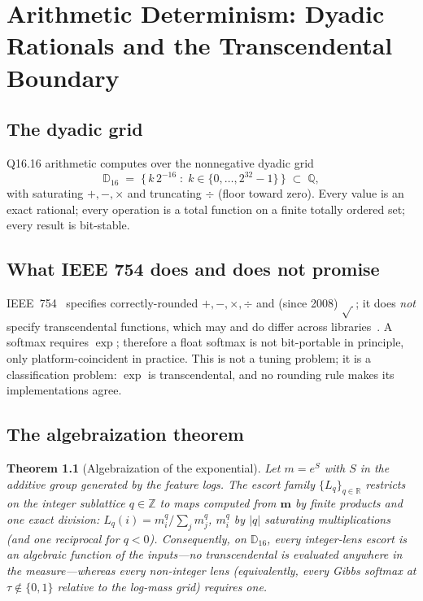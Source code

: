\documentclass[12pt,oneside]{report}
\theoremstyle{plain}
\newtheorem{theorem}{Theorem}[chapter]
\theoremstyle{definition}
\theoremstyle{remark}
\newcommand{\R}{\mathbb{R}}
\newcommand{\Z}{\mathbb{Z}}
\newcommand{\Q}{\mathbb{Q}}
\newcommand{\dyad}{\mathbb{D}}
\newcommand{\escort}[1]{L_{#1}}
\newcommand{\mass}{\mathbf{m}}
\begin{document}
\chapter{Arithmetic Determinism: Dyadic Rationals and the Transcendental Boundary}
\label{ch:arithmetic}

\section{The dyadic grid}

Q16.16 arithmetic computes over the nonnegative dyadic grid
\begin{equation}
\dyad_{16} \;=\; \bigl\{\, k\,2^{-16} \;:\; k\in\{0,\dots,2^{32}-1\}
\,\bigr\} \;\subset\; \Q,
\end{equation}
with saturating $+,-,\times$ and truncating $\div$ (floor toward zero).
Every value is an exact rational; every operation is a total function
on a finite totally ordered set; every result is bit-stable.

\section{What IEEE 754 does and does not promise}

IEEE~754~\cite{ieee754} specifies correctly-rounded $+,-,\times,\div$
and (since 2008) $\sqrt{\,}$; it does \emph{not} specify
transcendental functions, which may and do differ across
libraries~\cite{goldberg1991}. A softmax requires $\exp$; therefore a
float softmax is not bit-portable in principle, only
platform-coincident in practice. This is not a tuning problem; it is a
classification problem: $\exp$ is transcendental, and no rounding rule
makes its implementations agree.

\section{The algebraization theorem}

\begin{theorem}[Algebraization of the exponential]
\label{thm:algebraization}
Let $m=e^{S}$ with $S$ in the additive group generated by the feature
logs. The escort family $\{\escort{q}\}_{q\in\R}$ restricts on the
integer sublattice $q\in\Z$ to maps computed from $\mass$ by finite
products and one exact division:
$\escort{q}(i)=m_i^{q}/\sum_jm_j^{q}$, $m_i^q$ by $|q|$ saturating
multiplications (and one reciprocal for $q<0$). Consequently, on
$\dyad_{16}$, every integer-lens escort is an algebraic function of
the inputs---no transcendental is evaluated anywhere in the
measure---whereas every non-integer lens (equivalently, every Gibbs
softmax at $\tau\notin\{0,1\}$ relative to the log-mass grid) requires
one.
\end{theorem}
\end{document}
